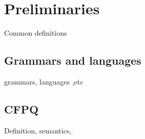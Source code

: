 \section{Preliminaries}

Common definitions

\subsection{Grammars and languages}
grammars, languages ,etc

\subsection{CFPQ}

Definition, semantics, 